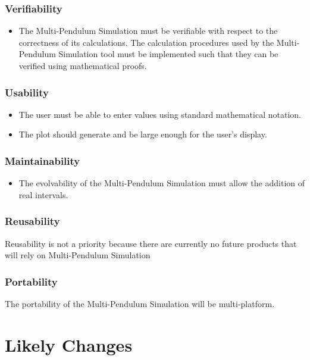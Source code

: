 \documentclass[12pt]{article}
\newcommand{\progname}{Multi-Pendulum Simulation }
\begin{document}
\subsubsection*{Verifiability}
\begin{itemize}
	\item The \progname must be verifiable with respect to the 
	correctness of its calculations. The calculation 
	procedures used by the \progname tool must be implemented such that 
	they can be verified using mathematical proofs.
\end{itemize}

\subsubsection*{Usability}
\begin{itemize}
	\item The user must be able to enter values using standard mathematical 
	notation.

	\item The plot should generate and be large enough for the user's display.
\end{itemize}

\subsubsection*{Maintainability}
\begin{itemize}
	\item The evolvability of the \progname must allow the addition 
	of real intervals.
\end{itemize}

\subsubsection*{Reusability}
Reusability is not a priority because there are currently no future products 
that will rely on \progname

\subsubsection*{Portability}
The portability of the \progname will be multi-platform.

\newpage

\section{Likely Changes}    
\end{document}
